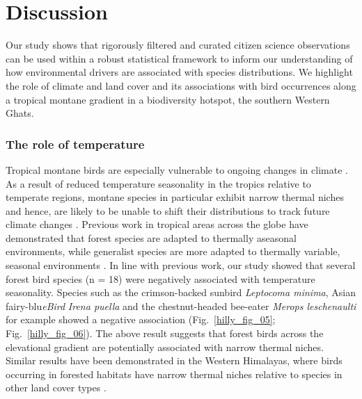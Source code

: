 \section*{Discussion}

Our study shows that rigorously filtered and curated citizen science observations can be used within a robust statistical framework to inform our understanding of how environmental drivers are associated with species distributions.
We highlight the role of climate and land cover and its associations with bird occurrences along a tropical montane gradient in a biodiversity hotspot, the southern Western Ghats.

\subsubsection*{The role of temperature}

Tropical montane birds are especially vulnerable to ongoing changes in climate \citep{sekercioglu2007,perez2016,freeman2018,srinivasan2018}.
As a result of reduced temperature seasonality in the tropics relative to temperate regions, montane species in particular exhibit narrow thermal niches and hence, are likely to be unable to shift their distributions to track future climate changes \citep{janzen1967,deutsch2008,tewksbury2008,jankowski2013}.
Previous work in tropical areas across the globe have demonstrated that forest species are adapted to thermally aseasonal environments, while generalist species are more adapted to thermally variable, seasonal environments \citep{frishkoff2016,chan2016}.
In line with previous work, our study showed that several forest bird species (n = 18) were negatively associated with temperature seasonality.
Species such as the crimson-backed sunbird \textit{Leptocoma minima}, Asian fairy-blu\textit{eBird} \textit{Irena puella} and the chestnut-headed bee-eater \textit{Merops leschenaulti} for example showed a negative association (Fig.~\ref{hilly_fig_05}; Fig.~\ref{hilly_fig_06}).
The above result suggests that forest birds across the elevational gradient are potentially associated with narrow thermal niches.
Similar results have been demonstrated in the Western Himalayas, where birds occurring in forested habitats have narrow thermal niches relative to species in other land cover types \citep{srinivasan2019}.

